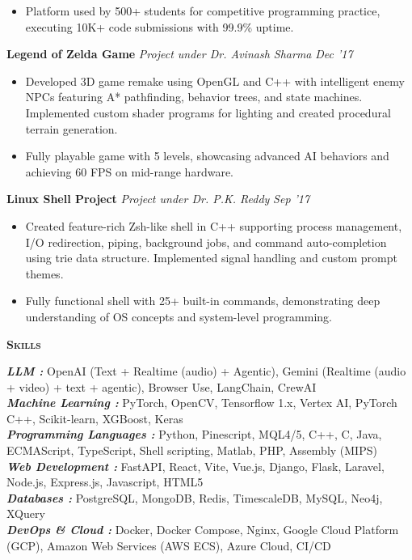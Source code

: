 \documentclass[10pt]{article}
\newcommand{\headerwidth}{7.45in}
\newenvironment{changemargin}[2]{%
  \begin{list}{}{%
    \setlength{\topsep}{0pt}%
    \setlength{\leftmargin}{#1}%
    \setlength{\rightmargin}{#2}%
    \setlength{\listparindent}{\parindent}%
    \setlength{\itemindent}{\parindent}%
    \setlength{\parsep}{\parskip}%
  }%
  \item[]}{\end{list}
}
\newcommand{\header}[1]{
	\begin{changemargin}{-0.75in}{-0.75in}
    \begin{tcolorbox}[colframe=mycolor,boxrule=0.0pt,arc=0pt,
      left=6pt,right=6pt,top=6pt,bottom=6pt,boxsep=0pt,width=\headerwidth]
		\scshape{\textbf{#1}}
\end{tcolorbox}
	\end{changemargin}
}
\newenvironment{body} {
	\vspace*{-16pt}
	\begin{changemargin}{-0.6in}{-0.65in}
  }
	{\end{changemargin}
}
\begin{document}
\begin{body}
\begin{itemize}
        \item Platform used by 500+ students for competitive programming practice, executing 10K+ code submissions with 99.9\% uptime.
    \end{itemize}
	\textbf{Legend of Zelda Game} \emph{Project under Dr. Avinash Sharma} \hfill \emph{Dec '17}
    \begin{itemize}
        \item Developed 3D game remake using OpenGL and C++ with intelligent enemy NPCs featuring A* pathfinding, behavior trees, and state machines. Implemented custom shader programs for lighting and created procedural terrain generation.
        \item Fully playable game with 5 levels, showcasing advanced AI behaviors and achieving 60 FPS on mid-range hardware.
    \end{itemize}
	\textbf{Linux Shell Project} \emph{Project under Dr. P.K. Reddy} \hfill \emph{Sep '17}
    \begin{itemize}
        \item Created feature-rich Zsh-like shell in C++ supporting process management, I/O redirection, piping, background jobs, and command auto-completion using trie data structure. Implemented signal handling and custom prompt themes.
        \item Fully functional shell with 25+ built-in commands, demonstrating deep understanding of OS concepts and system-level programming.
    \end{itemize}
\end{body}


\smallskip
\header{Skills}
\begin{body}
	\vspace{14pt}
	\emph{\textbf{LLM :}}{} OpenAI (Text + Realtime (audio) + Agentic), Gemini (Realtime (audio + video) + text + agentic), Browser Use, LangChain, CrewAI \\
	\emph{\textbf{Machine Learning :}}{} PyTorch, OpenCV, Tensorflow 1.x, Vertex AI, PyTorch C++, Scikit-learn, XGBoost, Keras \\
	\emph{\textbf{Programming Languages :}}{} Python, Pinescript, MQL4/5, C++, C, Java, ECMAScript, TypeScript, Shell scripting, Matlab, PHP, Assembly (MIPS) \\
	\emph{\textbf{Web Development :}}{} FastAPI, React, Vite, Vue.js, Django, Flask, Laravel, Node.js, Express.js, Javascript, HTML5 \\
	\emph{\textbf{Databases :}}{} PostgreSQL, MongoDB, Redis, TimescaleDB, MySQL, Neo4j, XQuery \\
	\emph{\textbf{DevOps \& Cloud :}}{} Docker, Docker Compose, Nginx, Google Cloud Platform (GCP), Amazon Web Services (AWS ECS), Azure Cloud, CI/CD \\
\end{body}
\end{document}
